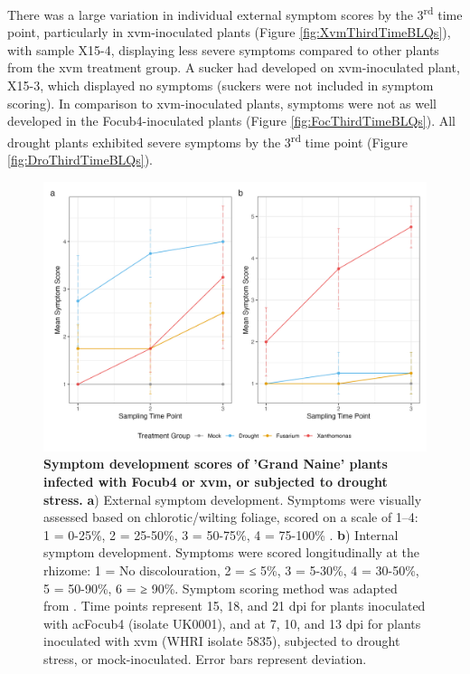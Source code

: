 There was a large variation in individual external symptom scores by the 3\textsuperscript{rd} time point, particularly in \ac{xvm}-inoculated plants (Figure \ref{fig:XvmThirdTimeBLQs}), with sample X15-4, displaying less severe symptoms compared to other plants from the \ac{xvm} treatment group. A sucker had developed on \ac{xvm}-inoculated plant, X15-3, which displayed no symptoms (suckers were not included in symptom scoring). In comparison to \ac{xvm}-inoculated plants, symptoms were not as well developed in the \ac{Focub4}-inoculated plants (Figure \ref{fig:FocThirdTimeBLQs}). All drought plants exhibited severe symptoms by the 3\textsuperscript{rd} time point (Figure \ref{fig:DroThirdTimeBLQs}).

\begin{figure}[b!]
  \centering
  \includegraphics[width=\textwidth]{Figures/Combined_Sympotoms_plot.png}
  \caption[Symptom development scores of 'Grand Naine' plants infected with \acl{Focub4} or \acl{xvm}, or subjected to drought stress.]{\textbf{Symptom development scores of 'Grand Naine' plants infected with \acf{Focub4} or \acf{xvm}, or subjected to drought stress.} \textbf{a}) External symptom development. Symptoms were visually assessed based on chlorotic/wilting foliage, scored on a scale of 1–4: 1 = 0-25\%, 2 = 25-50\%, 3 = 50-75\%, 4 = 75-100\% . \textbf{b}) Internal symptom development. Symptoms were scored longitudinally at the rhizome: 1 = No discolouration, 2 = ≤ 5\%, 3 = 5-30\%, 4 = 30-50\%, 5 = 50-90\%, 6 = ≥ 90\%. Symptom scoring method was adapted from \textcite{Garcia-Bastidas2019}. Time points represent 15, 18, and 21 \ac{dpi} for plants inoculated with ac{Focub4} (isolate UK0001), and at 7, 10, and 13 \ac{dpi} for plants inoculated with \ac{xvm} (WHRI isolate 5835), subjected to drought stress, or mock-inoculated. Error bars represent deviation.}
  \label{fig:SymptomDev}
\end{figure}



